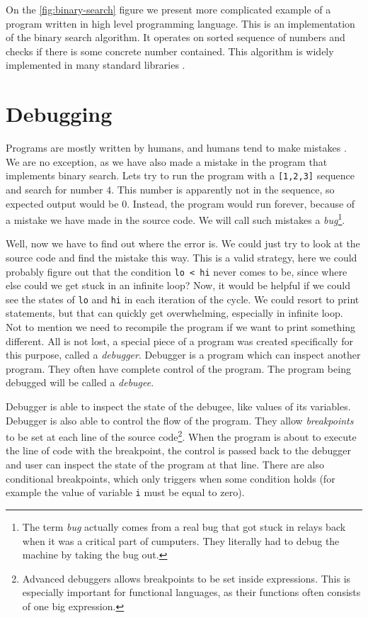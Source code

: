On the \ref{fig:binary-search} figure we present more complicated example of a
program written in high level programming language. This is an implementation
of the binary search algorithm. It operates on sorted sequence of numbers and
checks if there is some concrete number contained. This algorithm is widely
implemented in many standard libraries .

\section{Debugging}
Programs are mostly written by humans, and humans tend to make mistakes
\cite{human-error}. We are no exception, as we have also made a mistake in the
program that implements binary search. Lets try to run the program with a
\texttt{[1,2,3]} sequence and search for number $4$. This number is apparently
not in the sequence, so expected output would be $0$. Instead, the program
would run forever, because of a mistake we have made in the source code. We
will call such mistakes a \textit{bug}\footnote{The term \textit{bug} actually
comes from a real bug that got stuck in relays back when it was a critical part
of cumputers. They literally had to debug the machine by taking the bug out.}.

Well, now we have to find out where the error is. We could just try to look at
the source code and find the mistake this way. This is a valid strategy, here
we could probably figure out that the condition \texttt{lo < hi} never comes to
be, since where else could we get stuck in an infinite loop? Now, it would be
helpful if we could see the states of \texttt{lo} and \texttt{hi} in each
iteration of the cycle. We could resort to print statements, but that can
quickly get overwhelming, especially in infinite loop. Not to mention we need
to recompile the program if we want to print something different. All is not
lost, a special piece of a program was created specifically for this purpose,
called a \textit{debugger}. Debugger is a program which can inspect another
program. They often have complete control of the program. The program being
debugged will be called a \textit{debugee}.

Debugger is able to inspect the state of the debugee, like values of its
variables. Debugger is also able to control the flow of the program. They allow
\textit{breakpoints} to be set at each line of the source
code\footnote{Advanced debuggers allows breakpoints to be set inside
expressions. This is especially important for functional languages, as their
functions often consists of one big expression.}. When the program is about to
execute the line of code with the breakpoint, the control is passed back to the
debugger and user can inspect the state of the program at that line. There are
also conditional breakpoints, which only triggers when some condition holds
(for example the value of variable \texttt{i} must be equal to zero).

